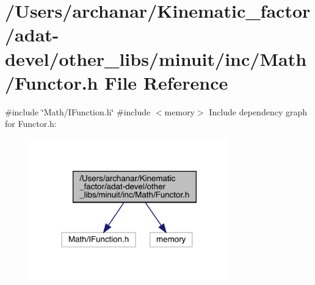 \hypertarget{adat-devel_2other__libs_2minuit_2inc_2Math_2Functor_8h}{}\section{/\+Users/archanar/\+Kinematic\+\_\+factor/adat-\/devel/other\+\_\+libs/minuit/inc/\+Math/\+Functor.h File Reference}
\label{adat-devel_2other__libs_2minuit_2inc_2Math_2Functor_8h}
{\ttfamily \#include \char`\"{}Math/\+I\+Function.\+h\char`\"{}}\newline
{\ttfamily \#include $<$memory$>$}\newline
Include dependency graph for Functor.\+h\+:
\nopagebreak
\begin{figure}[H]
\begin{center}
\leavevmode
\includegraphics[width=245pt]{d5/db0/adat-devel_2other__libs_2minuit_2inc_2Math_2Functor_8h__incl}
\end{center}
\end{figure}
